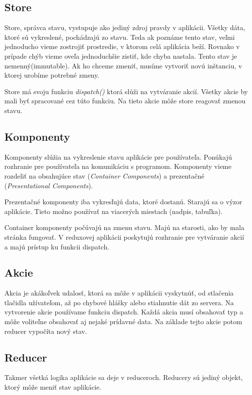 \subsection{Store}
Store, správca stavu, vystupuje ako jediný zdroj pravdy v aplikácii. Všetky dáta, ktoré sú vykreslené, pochádzajú zo stavu. Teda ak poznáme tento stav, veľmi jednoducho vieme zostrojiť prostredie, v ktorom celá aplikácia beží. Rovnako v prípade chýb vieme oveľa jednoduchšie zistiť, kde chyba nastala. Tento stav je nemenný(immutable). Ak ho chceme zmeniť, musíme vytvoriť novú inštanciu, v ktorej urobíme potrebné zmeny.

Store má svoju funkciu \emph{dispatch()} ktorá slúži na vytváranie akcií. Všetky akcie by mali byť spracované cez túto funkciu. Na tieto akcie môže store reagovať zmenou stavu.

\subsection{Komponenty}%
Komponenty slúžia na vykreslenie stavu aplikácie pre používateľa. Ponúkajú rozhranie pre používateľa na komunikáciu s programom. Komponenty vieme rozdeliť na obsahujúce stav (\emph{Container Components}) a prezentačné (\emph{Presentational Components}).%

Prezentačné komponenty iba vykresľujú data, ktoré dostanú. Starajú sa o výzor aplikácie. Tieto možno používať na viacerých miestach (nadpis, tabuľka). 

Container komponenty počúvajú na zmenu stavu. Majú na starosti, ako by mala stránka fungovať. V reduxovej aplikácii poskytujú rozhranie pre vytváranie akcií a majú prístup ku funkcii dispatch.

\subsection{Akcie}
Akcia je akákoľvek udalosť, ktorá sa môže v aplikácii vyskytnúť, od stlačenia tlačidla užívateľom, až po chybové hlášky alebo stiahnutie dát zo servera. Na vytvorenie akcie používame funkciu dispatch. Každá akcia musí obsahovať typ a môže voliteľne obsahovať aj nejaké prídavné data. Na základe tejto akcie potom reducer vypočíta nový stav.

\subsection{Reducer}%
Takmer všetká logika aplikácie sa deje v reduceroch. Reducery sú jediný objekt, ktorý môže meniť stav aplikácie.

